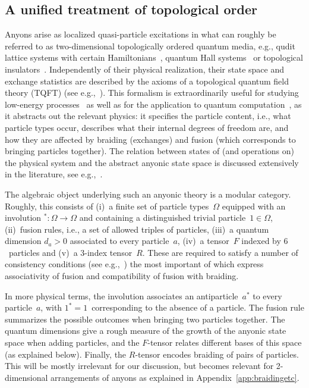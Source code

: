 \documentclass[floats,prb,twocolumn]{revtex4}
\begin{document}
\subsection{A unified treatment of topological order}
Anyons arise as localized quasi-particle excitations in  what can roughly be referred to as  two-dimensional topologically ordered quantum media, e.g., qudit lattice systems with certain Hamiltonians~\cite{Kitaev03,KitaevAnyons,LevinWen}, quantum Hall systems~\cite{MooreRead,readrezayia,readrezayib} or topological insulators~\cite{FuKane05,MooreBalents07,LiangKaneMele07,Roy09}. Independently of their physical realization,  their state space and exchange statistics are described by the axioms of a topological quantum field theory (TQFT) (see e.g.,~\cite{Walker91}). This formalism is extraordinarily useful for  studying low-energy processes~\cite{bonderson09} as well as for the application to quantum computation~\cite{preskill}, as it abstracts out the relevant physics: it specifies the particle content, i.e., what particle types occur, describes what their internal degrees of freedom are, and how they are affected by braiding (exchanges) and fusion (which corresponds to bringing particles together). The relation between states of (and operations on) the physical system  and the abstract anyonic state space is discussed extensively in the literature, see e.g.,~\cite{Kitaev03,KitaevAnyons,LevinWen,KoeKupRei,preskill,readrezayia}.  


The algebraic object underlying such an anyonic theory is a modular category. Roughly, this consists of (i)~a finite set of particle types~$\Omega$ equipped with an involution $^*:\Omega\rightarrow\Omega$ and containing a distinguished trivial particle~$1\in\Omega$, (ii)~fusion rules, i.e., a set of allowed triples of particles, (iii)~a quantum dimension $d_a>0$ associated to every particle~$a$, (iv)~a tensor~$F$ indexed by $6$~particles and (v)~a $3$-index tensor~$R$. These are required to satisfy a number of consistency conditions (see e.g.,~\cite{preskill}) the most important of which  express associativity of fusion and compatibility of fusion with braiding. 

In more physical terms, the involution associates an antiparticle~$a^*$ to every particle~$a$, with $1^*=1$~corresponding to the absence of a particle. The fusion rule summarizes the possible outcomes when bringing two particles together.  The quantum dimensions give a rough measure of the growth of the anyonic state space when adding particles, and the $F$-tensor relates different bases of this space (as explained below). Finally, the $R$-tensor encodes braiding of pairs of particles. This will be mostly irrelevant for our discussion, but becomes relevant for 2-dimensional arrangements of anyons as explained in Appendix~\ref{app:braidingetc}.
\end{document}
